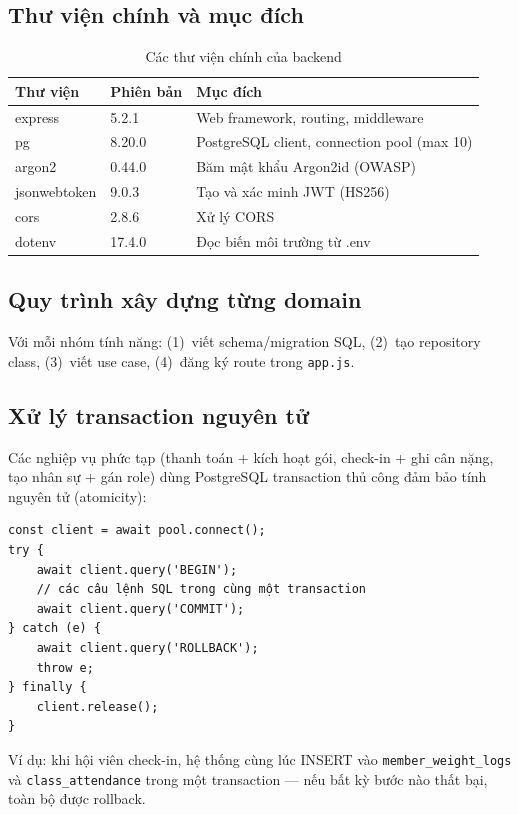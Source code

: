 \subsection{Thư viện chính và mục đích}
\begin{table}[h]
\centering
\begin{tabular}{|l|l|l|}
\hline
\textbf{Thư viện} & \textbf{Phiên bản} & \textbf{Mục đích} \\ \hline
express           & 5.2.1  & Web framework, routing, middleware \\
pg                & 8.20.0 & PostgreSQL client, connection pool (max 10) \\
argon2            & 0.44.0 & Băm mật khẩu Argon2id (OWASP) \\
jsonwebtoken      & 9.0.3  & Tạo và xác minh JWT (HS256) \\
cors              & 2.8.6  & Xử lý CORS \\
dotenv            & 17.4.0 & Đọc biến môi trường từ .env \\ \hline
\end{tabular}
\caption{Các thư viện chính của backend}
\end{table}

\subsection{Quy trình xây dựng từng domain}
Với mỗi nhóm tính năng: (1)~viết schema/migration SQL, (2)~tạo repository class, (3)~viết use case, (4)~đăng ký route trong \texttt{app.js}.

\subsection{Xử lý transaction nguyên tử}
Các nghiệp vụ phức tạp (thanh toán + kích hoạt gói, check-in + ghi cân nặng, tạo nhân sự + gán role) dùng PostgreSQL transaction thủ công đảm bảo tính nguyên tử (atomicity):
\begin{verbatim}
const client = await pool.connect();
try {
    await client.query('BEGIN');
    // các câu lệnh SQL trong cùng một transaction
    await client.query('COMMIT');
} catch (e) {
    await client.query('ROLLBACK');
    throw e;
} finally {
    client.release();
}
\end{verbatim}
Ví dụ: khi hội viên check-in, hệ thống cùng lúc INSERT vào \texttt{member\_weight\_logs} và \texttt{class\_attendance} trong một transaction — nếu bất kỳ bước nào thất bại, toàn bộ được rollback.

